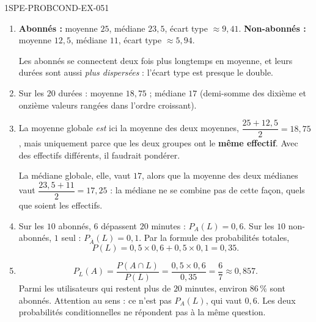 \begin{corrige}{1SPE-PROBCOND-EX-051}
\begin{enumerate}
\item \textbf{Abonnés :} moyenne $25$, médiane $23{,}5$, écart type
  $\approx 9{,}41$.
  \textbf{Non-abonnés :} moyenne $12{,}5$, médiane $11$, écart type
  $\approx 5{,}94$.

  Les abonnés se connectent deux fois plus longtemps en moyenne, et leurs
  durées sont aussi \emph{plus dispersées} : l'écart type est presque le
  double.

\item Sur les $20$ durées : moyenne $18{,}75$ ; médiane $17$ (demi-somme des
  dixième et onzième valeurs rangées dans l'ordre croissant).

\item La moyenne globale \emph{est} ici la moyenne des deux moyennes,
  $\dfrac{25 + 12{,}5}{2} = 18{,}75$, mais uniquement parce que les deux
  groupes ont le \textbf{même effectif}. Avec des effectifs différents, il
  faudrait pondérer.

  La médiane globale, elle, vaut $17$, alors que la moyenne des deux médianes
  vaut $\dfrac{23{,}5 + 11}{2} = 17{,}25$ : la médiane ne se combine pas de
  cette façon, quels que soient les effectifs.

\item Sur les $10$ abonnés, $6$ dépassent $20$ minutes :
  $P_A(L) = 0{,}6$. Sur les $10$ non-abonnés, $1$ seul :
  $P_{\overline{A}}(L) = 0{,}1$. Par la formule des probabilités totales,
  \[
    P(L) = 0{,}5 \times 0{,}6 + 0{,}5 \times 0{,}1 = 0{,}35 .
  \]

\item
  \[
    P_L(A) = \frac{P(A \cap L)}{P(L)} = \frac{0{,}5\times0{,}6}{0{,}35}
    = \frac{6}{7} \approx 0{,}857 .
  \]
  Parmi les utilisateurs qui restent plus de $20$ minutes, environ $86\,\%$
  sont abonnés. Attention au sens : ce n'est pas $P_A(L)$, qui vaut $0{,}6$.
  Les deux probabilités conditionnelles ne répondent pas à la même question.
\end{enumerate}
\end{corrige}
